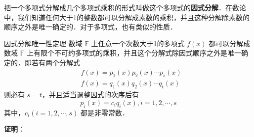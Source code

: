 
把一个多项式分解成几个多项式乘积的形式叫做这个多项式的\textbf{因式分解}．在数论中，我们知道任何大于1的整数都可以分解成素数的乘积，并且这种分解除素数的顺序之外是唯一确定的．对于多项式，也有类似的性质．
\begin{theorem}{因式分解唯一性定理}
数域 $\mathbb{F}$ 上任意一个次数大于1的多项式 $f(x)$ 都可以分解成数域 $\mathbb{F}$ 上有限个不可约多项式的乘积，并且这个分解式除因式顺序之外是唯一确定的．即若有两个分解式
 \begin{equation}
 \begin{aligned}
 &f(x)=p_1(x)p_2(x)\cdots p_s(x)\\
 &f(x)=q_1(x)q_2(x)\cdots q_t(x)
 \end{aligned}
 \end{equation}
 则必有 $s=t$，并且适当调整因式的次序后有
 \begin{equation}
 p_i(x)=c_iq_i(x),i=1,2,\cdots,s
 \end{equation}
 其中，$c_i(i=1,2,\cdots,s)$ 都是非零常数．
\end{theorem}
\textbf{证明}：